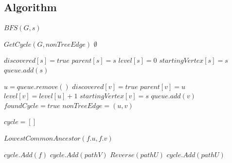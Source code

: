 \documentclass{article}
\begin{document}
    \subsection*{Algorithm}
        \begin{algorithm}[H]
            \begin{algorithmic}
                            \State $BFS(G, s)$
                        \EndIf
                    \EndFor

                        \State \Return $GetCycle(G, nonTreeEdge)$
                    \Else
                        \State \Return $\emptyset$
                    \EndIf
                \EndProcedure

                    \State $discovered[s] = true$
                    \State $parent[s] = s$
                    \State $level[s] = 0$
                    \State $startingVertex[s] = s$
                    \State $queue.add(s)$

                        \State $u = queue.remove()$
                                \State $discovered[v] = true$
                                \State $parent[v] = u$
                                \State $level[v] = level[u]+1$
                                \State $startingVertex[v] = s$
                                \State $queue.add(v)$
                            \Else
                                \State $foundCycle = true$
                                \State $nonTreeEdge = (u,v)$
                            \EndIf
                        \EndFor
                    \EndWhile
                \EndProcedure

                    \State $cycle = []$

                    \State $LowestCommonAncestor(f.u, f.v)$

                    \State $cycle.Add(f)$
                    \State $cycle.Add(pathV)$
                    \State $Reverse(pathU)$
                    \State $cycle.Add(pathU)$


\end{algorithmic}
\end{algorithm}
\end{document}
